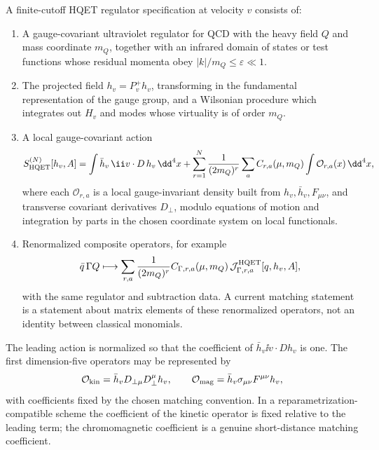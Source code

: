 \begin{definition}
\label{def:hqet-regulator-specification}
A finite-cutoff HQET regulator specification at velocity \(v\) consists of:
\begin{enumerate}
  \item A gauge-covariant ultraviolet regulator for QCD with the heavy field
  \(Q\) and mass coordinate \(m_Q\), together with an infrared domain of states
  or test functions whose residual momenta obey \(|k|/m_Q\le\varepsilon\ll1\).
  \item The projected field \(h_v=P_v^+h_v\), transforming in the fundamental
  representation of the gauge group, and a Wilsonian procedure which
  integrates out \(H_v\) and modes whose virtuality is of order \(m_Q\).
  \item A local gauge-covariant action
  \begin{equation}
    S_{\rm HQET}^{(N)}[h_v,A]
    =
    \int \bar h_v\,\ii v\cdot D\,h_v\,\dd^4x
    +\sum_{r=1}^N\frac1{(2m_Q)^r}
      \sum_a C_{r,a}(\mu,m_Q)\int \mathcal O_{r,a}(x)\,\dd^4x ,
    \label{eq:hqet-local-action}
  \end{equation}
  where each \(\mathcal O_{r,a}\) is a local gauge-invariant density built
  from \(h_v,\bar h_v,F_{\mu\nu}\), and transverse covariant derivatives
  \(D_\perp\), modulo equations of motion and integration by parts in the
  chosen coordinate system on local functionals.
  \item Renormalized composite operators, for example
  \[
    \bar q\,\Gamma Q
    \longmapsto
    \sum_{r,a}\frac1{(2m_Q)^r}C_{\Gamma,r,a}(\mu,m_Q)\,
    \mathcal J_{\Gamma,r,a}^{\rm HQET}[q,h_v,A],
  \]
  with the same regulator and subtraction data.  A current matching statement
  is a statement about matrix elements of these renormalized operators, not an
  identity between classical monomials.
\end{enumerate}
The leading action is normalized so that the coefficient of
\(\bar h_v\ii v\cdot D h_v\) is one.  The first dimension-five operators may
be represented by
\begin{equation}
  \mathcal O_{\rm kin}=\bar h_vD_{\perp\mu}D_\perp^\mu h_v,
  \qquad
  \mathcal O_{\rm mag}=\bar h_v\sigma_{\mu\nu}F^{\mu\nu}h_v ,
  \label{eq:hqet-dimension-five-operators}
\end{equation}
with coefficients fixed by the chosen matching convention.  In a
reparametrization-compatible scheme the coefficient of the kinetic operator is
fixed relative to the leading term; the chromomagnetic coefficient is a
genuine short-distance matching coefficient.
\end{definition}

